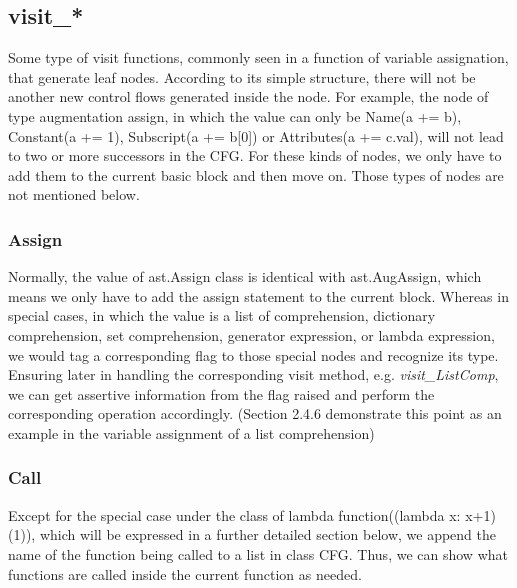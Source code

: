 \documentclass[11pt]{article}
\begin{document}
\subsection{visit\_*}
Some type of visit functions, commonly seen in a function of variable assignation, that generate leaf nodes. According to its simple structure, there will not be another new control flows generated inside the node. For example, the node of type augmentation assign, in which the value can only be Name(a += b), Constant(a += 1), Subscript(a += b[0]) or Attributes(a += c.val), will not lead to two or more successors in the CFG. For these kinds of nodes, we only have to add them to the current basic block and then move on. Those types of nodes are not mentioned below.

\subsubsection{Assign}
Normally, the value of ast.Assign class is identical with ast.AugAssign, which means we only have to add the assign statement to the current block. Whereas in special cases, in which the value is a list of comprehension, dictionary comprehension, set comprehension, generator expression, or lambda expression, we would tag a corresponding flag to those special nodes and recognize its type. Ensuring later in handling the corresponding visit method, e.g. \textit{visit\_ListComp}, we can get assertive information from the flag raised and perform the corresponding operation accordingly. (Section 2.4.6 demonstrate this point as an example in the variable assignment of a list comprehension)

\subsubsection{Call}
Except for the special case under the class of lambda function((lambda x: x+1)(1)), which will be expressed in a further detailed section below, we append the name of the function being called to a list in class CFG. Thus, we can show what functions are called inside the current function as needed.
\end{document}
